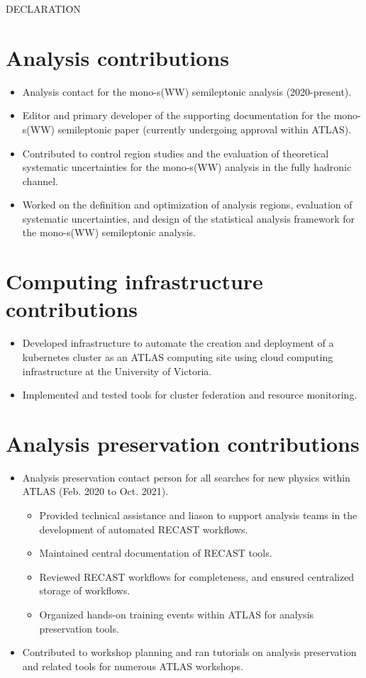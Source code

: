 \begin{center}
DECLARATION
\end{center}

\section*{Analysis contributions}

\begin{itemize}
\item Analysis contact for the mono-s(WW) semileptonic analysis (2020-present).
\item Editor and primary developer of the supporting documentation for the mono-s(WW) semileptonic paper (currently undergoing approval within ATLAS).
\item Contributed to control region studies and the evaluation of theoretical systematic uncertainties for the mono-s(WW) analysis in the fully hadronic channel.
\item Worked on the definition and optimization of analysis regions, evaluation of systematic uncertainties, and design of the statistical analysis framework for the mono-s(WW) semileptonic analysis.
\end{itemize}

\section*{Computing infrastructure contributions}
\begin{itemize}
\item Developed infrastructure to automate the creation and deployment of a kubernetes cluster as an ATLAS computing site using cloud computing infrastructure at the University of Victoria.
\item Implemented and tested tools for cluster federation and resource monitoring. 
\end{itemize}

\section*{Analysis preservation contributions}
\begin{itemize}
\item Analysis preservation contact person for all searches for new physics within ATLAS (Feb. 2020 to Oct. 2021).
\begin{itemize}
\item Provided technical assistance and liason to support analysis teams in the development of automated RECAST workflows.
\item Maintained central documentation of RECAST tools.
\item Reviewed RECAST workflows for completeness, and ensured centralized storage of workflows.
\item Organized hands-on training events within ATLAS for analysis preservation tools.
\end{itemize}
\item Contributed to workshop planning and ran tutorials on analysis preservation and related tools for numerous ATLAS workshops.
\end{itemize}